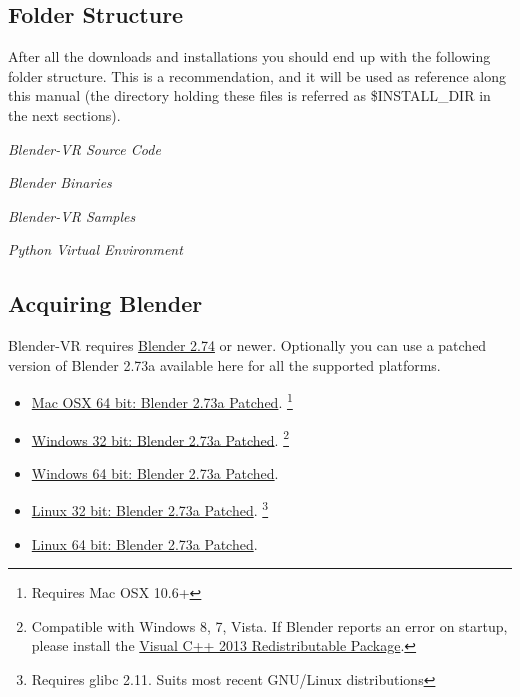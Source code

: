 \documentclass[a4,10pt,openany,oneside]{sphinxmanual}
\begin{document}
\subsection{Folder Structure}
\label{installation/installation:folder-structure}
After all the downloads and installations you should end up with the following folder structure. This is a recommendation, and it will be used as reference along this manual (the directory holding these files is  referred as \$INSTALL\_DIR in the next sections).

\emph{Blender-VR Source Code}

\emph{Blender Binaries}

\emph{Blender-VR Samples}

\emph{Python Virtual Environment}


\subsection{Acquiring Blender}
\label{installation/installation:acquiring-blender}
Blender-VR requires \href{http://www.blender.org/download}{Blender 2.74} or newer.
Optionally you can use  a patched version of Blender 2.73a available here for all the supported platforms.
\begin{itemize}
\item {} 
\href{http://www.dalaifelinto.com/blendervr/ftp/blender-2.73-5c6ef95-OSX-10.6-x86\_64.zip}{Mac OSX 64 bit: Blender 2.73a Patched}. \footnote{
Requires Mac OSX 10.6+
}

\item {} 
\href{http://www.dalaifelinto.com/blendervr/ftp/https://builder.blender.org/download/blender-2.73-5c6ef95-win32.zip}{Windows 32 bit: Blender 2.73a Patched}. \footnote{
Compatible with Windows 8, 7, Vista. If Blender reports an error on startup, please install the \href{http://www.microsoft.com/en-us/download/details.aspx?id=40784}{Visual C++ 2013 Redistributable Package}.
}

\item {} 
\href{http://www.dalaifelinto.com/blendervr/ftp/blender-2.73-5c6ef95-win64.zip}{Windows 64 bit: Blender 2.73a Patched}. \footnotemark[2]

\item {} 
\href{http://www.dalaifelinto.com/blendervr/ftp/blender-2.73-5c6ef95-linux-glibc211-i686.tar.bz2}{Linux 32 bit: Blender 2.73a Patched}. \footnote{
Requires glibc 2.11. Suits most recent GNU/Linux distributions
}

\item {} 
\href{http://www.dalaifelinto.com/blendervr/ftp/blender-2.73-5c6ef95-linux-glibc211-x86\_64.tar.bz2}{Linux 64 bit: Blender 2.73a Patched}. \footnotemark[3]

\end{itemize}
\end{document}
